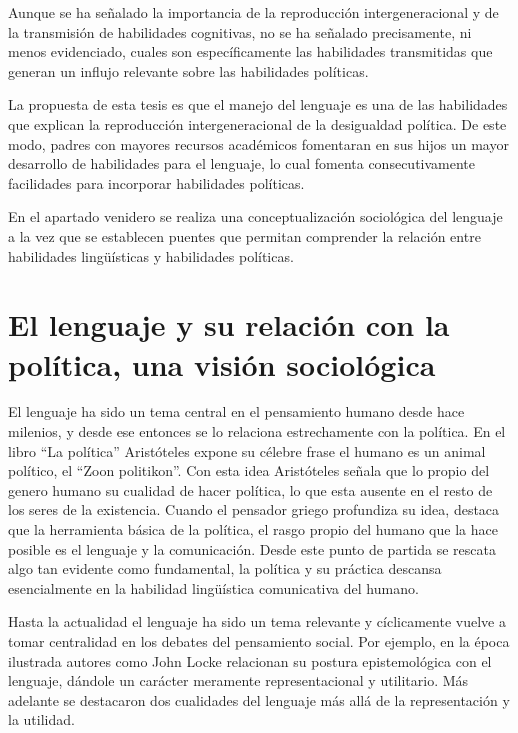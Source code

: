 \documentclass[12pt,twoside]{templates/facsothesis}
\begin{document}
Aunque se ha señalado la importancia de la reproducción intergeneracional y de la transmisión de habilidades cognitivas, no se ha señalado precisamente, ni menos evidenciado, cuales son específicamente las habilidades transmitidas que generan un influjo relevante sobre las habilidades políticas.

La propuesta de esta tesis es que el manejo del lenguaje es una de las habilidades que explican la reproducción intergeneracional de la desigualdad política. De este modo, padres con mayores recursos académicos fomentaran en sus hijos un mayor desarrollo de habilidades para el lenguaje, lo cual fomenta consecutivamente facilidades para incorporar habilidades políticas.

En el apartado venidero se realiza una conceptualización sociológica del lenguaje a la vez que se establecen puentes que permitan comprender la relación entre habilidades lingüísticas y habilidades políticas.

\hypertarget{el-lenguaje-y-su-relaciuxf3n-con-la-poluxedtica-una-visiuxf3n-socioluxf3gica}{%
\section{El lenguaje y su relación con la política, una visión sociológica}\label{el-lenguaje-y-su-relaciuxf3n-con-la-poluxedtica-una-visiuxf3n-socioluxf3gica}}

El lenguaje ha sido un tema central en el pensamiento humano desde hace milenios, y desde ese entonces se lo relaciona estrechamente con la política. En el libro ``La política'' Aristóteles expone su célebre frase el humano es un animal político, el ``Zoon politikon''. Con esta idea Aristóteles señala que lo propio del genero humano su cualidad de hacer política, lo que esta ausente en el resto de los seres de la existencia. Cuando el pensador griego profundiza su idea, destaca que la herramienta básica de la política, el rasgo propio del humano que la hace posible es el lenguaje y la comunicación. Desde este punto de partida se rescata algo tan evidente como fundamental, la política y su práctica descansa esencialmente en la habilidad lingüística comunicativa del humano.

Hasta la actualidad el lenguaje ha sido un tema relevante y cíclicamente vuelve a tomar centralidad en los debates del pensamiento social. Por ejemplo, en la época ilustrada autores como John Locke relacionan su postura epistemológica con el lenguaje, dándole un carácter meramente representacional y utilitario. Más adelante se destacaron dos cualidades del lenguaje más allá de la representación y la utilidad.
\end{document}
